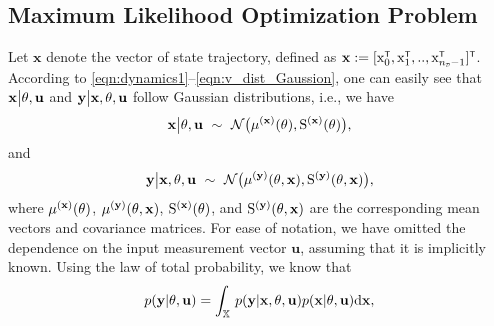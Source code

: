 \subsection{Maximum Likelihood Optimization Problem}\label{sec:ML formulation}
Let $\mathbf{x}$ denote the vector of state trajectory, defined as $\mathbf{x} := [\vcx_0^\tr,\vcx_1^\tr,..,\vcx_{{\nsD}-1}^\tr]^\tr$. 
According to \eqref{eqn:dynamics1}--\eqref{eqn:v_dist_Gaussion}, one can easily see that $\mathbf{x}\big|{ \mathrm{\theta} },\mathbf{u}$ and $\mathbf{y}\big|\mathbf{x},{ \mathrm{\theta} },\mathbf{u}$ follow Gaussian distributions, i.e., we have
\begin{equation}
  \mathbf{x}\big|\vctheta,\mathbf{u} 
  \ \sim \ 
  \mathcal{N}
  \big(
  \mu^{(\mathbf{x})}(\vctheta), \mxS^{(\mathbf{x})}(\vctheta)
  \big),
\end{equation}
and 
\begin{equation}
  \mathbf{y}\big|\mathbf{x},{ \mathrm{\theta} },\mathbf{u} 
  \ \sim \
  \mathcal{N}
  \big(
  \mu^{(\mathbf{y})}({ \mathrm{\theta} },\mathbf{x}), { \mathrm{S} }^{(\mathbf{y})}({ \mathrm{\theta} },\mathbf{x})
  \big),  
\end{equation}
where 
$\mu^{(\mathbf{x})}({ \mathrm{\theta} })$, 
$\mu^{(\mathbf{y})}({ \mathrm{\theta} },\mathbf{x})$, 
${ \mathrm{S} }^{(\mathbf{x})}({ \mathrm{\theta} })$, and
${ \mathrm{S} }^{(\mathbf{y})}({ \mathrm{\theta} },\mathbf{x})$
are the corresponding mean vectors and covariance matrices.
For ease of notation, we have omitted the dependence on the input measurement vector $\mathbf{u}$, assuming that it is implicitly known.
Using the law of total probability, we know that 
\begin{equation}\label{eq:law_of_total_probability}
\begin{split}
p(\mathbf{y}|{ \mathrm{\theta} }, \mathbf{u}) 
= 
\int_{{\mathbb{X}}}
\,
p(\mathbf{y}|\mathbf{x}, { \mathrm{\theta} }, \mathbf{u})p(\mathbf{x}|{ \mathrm{\theta} }, \mathbf{u}) \mathrm{d} \mathbf{x}, 
\end{split}
\end{equation}

